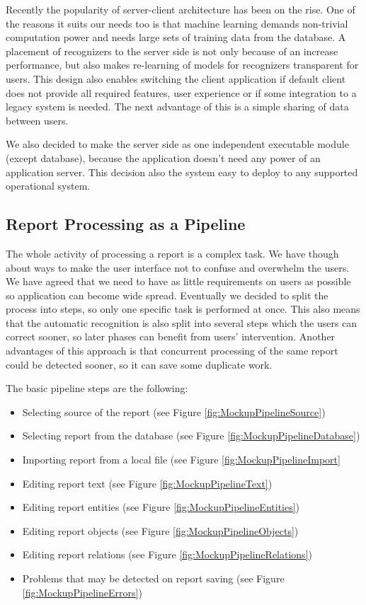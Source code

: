 Recently the popularity of server-client architecture has been on the rise.
One of the reasons it suits our needs too is that machine learning demands non-trivial
computation power and needs large sets of training data from the database. A placement of recognizers
to the server side is not only because of an increase performance, but also makes
re-learning of models for recognizers transparent for users. This design also enables
switching the client application if default \textan{} client does not provide all
required features, user experience or if some integration to a legacy system is needed.
The next advantage of this is a simple sharing of data between users.

We also decided to make the server side as one independent executable module (except database),
because the application doesn't need any power of an application server. This decision
also the system easy to deploy to any supported operational system.

\subsection{Report Processing as a Pipeline}
\label{ssec:ReportPipeline}

The whole activity of processing a report is a complex task. We have though
about ways to make the user interface not to confuse and overwhelm the users.
We have agreed that we need to have as little requirements on users as possible
so application can become wide spread. Eventually we decided to split the
process into steps, so only one specific task is performed at once. This also
means that the automatic recognition is also split into several steps which the
users can correct sooner, so later phases can benefit from users' intervention.
Another advantages of this approach is that concurrent processing of the same
report could be detected sooner, so it can save some duplicate work.

The basic pipeline steps are the following:
\begin{itemize}
	\item Selecting source of the report (see Figure \ref{fig:MockupPipelineSource})
	\item Selecting report from the database (see Figure \ref{fig:MockupPipelineDatabase})
	\item Importing report from a local file (see Figure \ref{fig:MockupPipelineImport}
	\item Editing report text (see Figure \ref{fig:MockupPipelineText})
	\item Editing report entities (see Figure \ref{fig:MockupPipelineEntities})
	\item Editing report objects (see Figure \ref{fig:MockupPipelineObjects})
	\item Editing report relations (see Figure \ref{fig:MockupPipelineRelations})
	\item Problems that may be detected on report saving (see Figure \ref{fig:MockupPipelineErrors})
\end{itemize}

